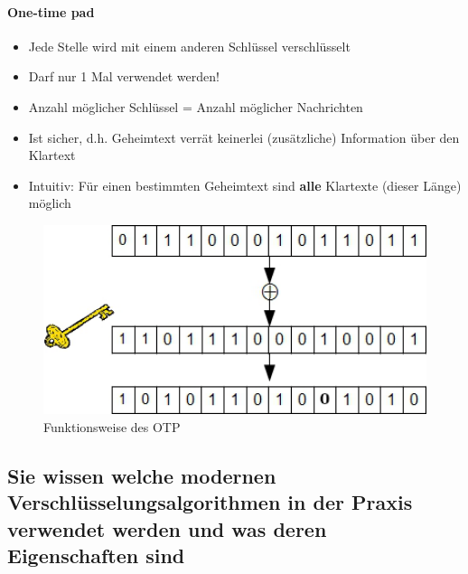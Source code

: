 \documentclass[10pt,a4paper]{article}
\begin{document}
\paragraph*{One-time pad}\label{para:One-Time Pad}
\begin{itemize}[noitemsep,topsep=0pt,leftmargin=*]
    \item Jede Stelle wird mit einem anderen Schlüssel verschlüsselt
    \item Darf nur 1 Mal verwendet werden!
    \item Anzahl möglicher Schlüssel = Anzahl möglicher Nachrichten
    \item Ist sicher, d.h. Geheimtext verrät keinerlei (zusätzliche) Information über den Klartext
    \item Intuitiv: Für einen bestimmten Geheimtext sind \textbf{alle} Klartexte (dieser Länge) möglich
\end{itemize}
\begin{figure}[H]
    \begin{center}
    \includegraphics[width=12cm]{images/otp.png}
    \caption{Funktionsweise des OTP}
    \label{otp}
    \end{center}
\end{figure}


\subsection*{Sie wissen welche modernen Verschlüsselungsalgorithmen in der Praxis verwendet werden und was deren Eigenschaften sind}
\end{document}
